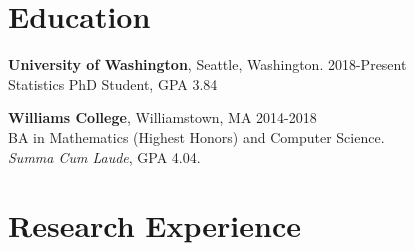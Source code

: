 \documentclass[margin, 10pt]{res} %
\begin{document}
\begin{resume}

 
\section{Education} 

{\textbf{University of Washington},} Seattle, Washington. \hfill 2018-Present \\
Statistics PhD Student, GPA 3.84 

{\textbf{Williams College}}, Williamstown, MA \hfill 2014-2018  \\
BA in Mathematics (Highest Honors) and Computer Science. \\ 
\textit{Summa Cum Laude}, GPA 4.04. 
 
 
\section{Research Experience}


\end{resume}
\end{document}
